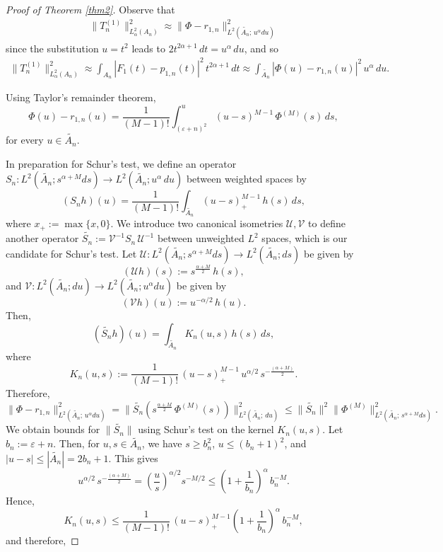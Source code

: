 \documentclass[11pt,a4paper,reqno,dvipsnames]{amsart}
\newcommand{\ep}{\varepsilon}
\renewcommand{\ge}{\geqslant}
\renewcommand{\le}{\leqslant}
\newcommand{\inv}{^{-1}}
\numberwithin{equation}{section}
\theoremstyle{plain}
\theoremstyle{definition}
\theoremstyle{remark}
\begin{document}
\begin{proof}[Proof of Theorem \ref{thm2}]
Observe that 
\begin{align*}
    \|T_n^{(1)}\|^2_{L^2_\alpha(A_n)} \approx \|\Phi - r_{1,n}\|_{L^2(\widetilde{A_n}; \,u^\alpha du)}^2
\end{align*}
since the substitution  $u = t^2$ leads to $2t^{2\alpha + 1}\, dt = u^\alpha\, du$, and so
\begin{align*}
    \|T_n^{(1)}\|^2_{L^2_\alpha(A_n)} \approx \int_{A_n} |F_1(t) - p_{1,n}(t)|^2\, t^{2\alpha + 1}\, dt \approx \int_{\widetilde{A_n}} |\Phi(u) - r_{1,n}(u)|^2\, u^{\alpha}\, du. 
\end{align*} 

Using Taylor's remainder theorem,
$$\Phi(u) - r_{1,n}(u) = \frac{1}{(M-1)!} \int_{(\ep + n)^2}^u (u-s)^{M-1}\, \Phi^{(M)}(s)\, ds,$$
for every $u \in \widetilde{A_n}$.

In preparation for Schur's test, we define an operator $S_n: L^2(\widetilde{A_n}; s^{\alpha+ M} ds) \to L^2(\widetilde{A_n}; u^\alpha\, du)$ between weighted spaces by
$$(S_n h)(u) = \frac{1}{(M-1)!} \int_{\widetilde{A_n}} (u-s)_+^{M-1}\, h(s)\, ds,$$
where $x_+ := \max\{x,0\}$. We introduce two canonical isometries $\mathcal{U}, \mathcal{V}$ to define another operator $\widetilde{S_n} := \mathcal{V}\inv S_n\, \mathcal{U}\inv$ between unweighted $L^2$ spaces, which is our candidate for Schur's test. Let 
$\mathcal{U}: L^2(\widetilde{A_n}; s^{\alpha + M} ds) \to L^2(\widetilde{A_n}; ds)$ be given by $$(\mathcal{U}h)(s) := s^{\frac{\alpha + M}{2}}\, h(s),$$
and $\mathcal{V}: L^2(\widetilde{A_n}; du) \to L^2(\widetilde{A_n}; u^\alpha du)$ be given by
$$(\mathcal{V}h)(u) := u^{-\alpha/2}\, h(u).$$
Then,
$$(\widetilde{S_n} h)(u) = \int_{\widetilde{A_n}} K_n(u,s)\, h(s)\, ds,$$
where 
$$K_n(u,s) := \frac{1}{(M-1)!}\, (u-s)_+^{M-1}\, u^{\alpha/2}\, s^{-\frac{(\alpha + M)}{2}}.$$
Therefore,
$$\|\Phi - r_{1,n}\|_{L^2(\widetilde{A_n}; \,u^\alpha du)}^2 = \|\widetilde{S_n}(s^{\frac{\alpha + M}{2}}\, \Phi^{(M)}(s))\|_{L^2(\widetilde{A_n};\, du)}^2 \le \|\widetilde{S_n}\|^2 \|\Phi^{(M)}\|_{L^2(\widetilde{A_n}; \, s^{\alpha + M} ds)}^2.$$
We obtain bounds for $\|\widetilde{S_n}\|$ using Schur's test on the kernel $K_n(u,s)$. Let $b_n := \ep + n$. Then, for $u,s \in \widetilde{A_n}$, we have $s \ge b_n^2$, $u \le (b_n + 1)^2$, and $|u-s| \le |\widetilde{A_n}| = 2b_n + 1$. This gives
$$u^{\alpha/2}\, s^{-\frac{(\alpha + M)}{2}} = \left(\frac{u}{s} \right)^{\alpha/2} s^{-M/2} \le \left(1 + \frac{1}{b_n}\right)^\alpha\, b_n^{-M}.$$
Hence, $$K_n(u,s) \le  \frac{1}{(M-1)!}\, (u-s)_+^{M-1} \left(1 + \frac{1}{b_n}\right)^\alpha\, b_n^{-M},$$ and therefore,

\end{proof}
\end{document}
